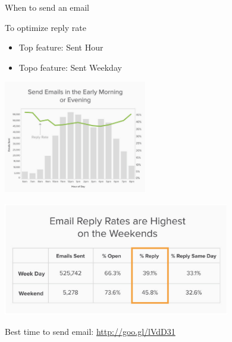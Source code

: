 \documentclass[10pt]{beamer}
\begin{document}
    \begin{frame}{When to send an email}
          \begin{block}{To optimize reply rate}
            \begin{itemize}
              \item<1-> Top feature: Sent Hour
              \item<2-> Topo feature: Sent Weekday
            \end{itemize}
          \end{block}
          \begin{overprint}
            \begin{center}
              \includegraphics[height=140pt]{../graphs/email_analysis_sent_hour}
            \end{center}
            \begin{center}
              \includegraphics[height=140pt]{../graphs/email_analysis_sent_weekday}
            \end{center}
          \end{overprint}
     \centerline{\footnotesize Best time to send email: \url{http://goo.gl/lVdD31}}
    \end{frame}
\end{document}
